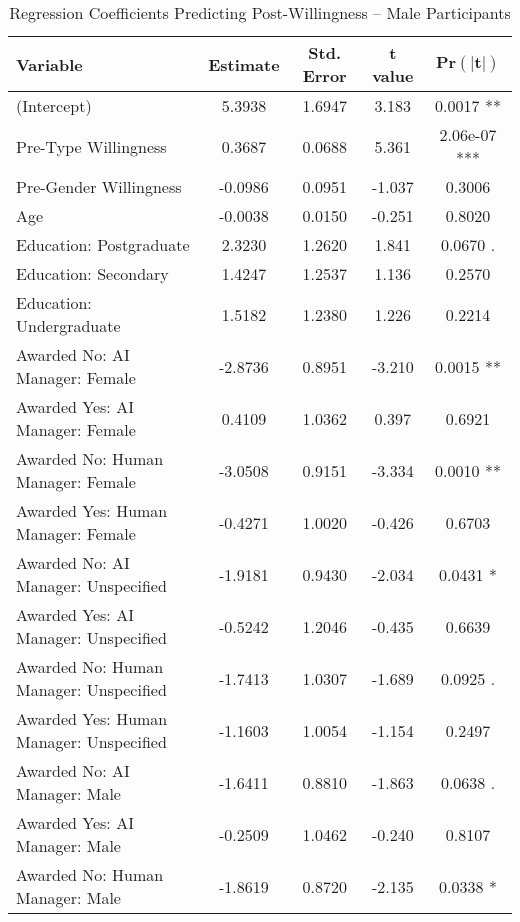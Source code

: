\begin{table}[ht]
    \centering
    \caption{Regression Coefficients Predicting Post-Willingness -- Male Participants}
    \begin{tabular}{lcccc}
        \toprule
        \textbf{Variable} & \textbf{Estimate} & \textbf{Std. Error} & \textbf{t value} & 
        $\mathbf{\text{Pr}(|t|)}$
        \\
        \midrule
        (Intercept) & 5.3938  & 1.6947  & 3.183  & 0.0017 **  \\
        Pre-Type Willingness & 0.3687  & 0.0688  & 5.361  & 2.06e-07 ***  \\
        Pre-Gender Willingness & -0.0986  & 0.0951  & -1.037  & 0.3006  \\
        Age & -0.0038  & 0.0150  & -0.251  & 0.8020  \\
        Education: Postgraduate & 2.3230  & 1.2620  & 1.841  & 0.0670 .  \\
        Education: Secondary & 1.4247  & 1.2537  & 1.136  & 0.2570  \\
        Education: Undergraduate & 1.5182  & 1.2380  & 1.226  & 0.2214  \\
        Awarded No: AI Manager: Female & -2.8736  & 0.8951  & -3.210  & 0.0015 **  \\
        Awarded Yes: AI Manager: Female & 0.4109  & 1.0362  & 0.397  & 0.6921  \\
        Awarded No: Human Manager: Female & -3.0508  & 0.9151  & -3.334  & 0.0010 **  \\
        Awarded Yes: Human Manager: Female & -0.4271  & 1.0020  & -0.426  & 0.6703  \\
        Awarded No: AI Manager: Unspecified & -1.9181  & 0.9430  & -2.034  & 0.0431 *  \\
        Awarded Yes: AI Manager: Unspecified & -0.5242  & 1.2046  & -0.435  & 0.6639  \\
        Awarded No: Human Manager: Unspecified & -1.7413  & 1.0307  & -1.689  & 0.0925 .  \\
        Awarded Yes: Human Manager: Unspecified & -1.1603  & 1.0054  & -1.154  & 0.2497  \\
        Awarded No: AI Manager: Male & -1.6411  & 0.8810  & -1.863  & 0.0638 .  \\
        Awarded Yes: AI Manager: Male & -0.2509  & 1.0462  & -0.240  & 0.8107  \\
        Awarded No: Human Manager: Male & -1.8619  & 0.8720  & -2.135  & 0.0338 *  \\

\end{tabular}
\end{table}
